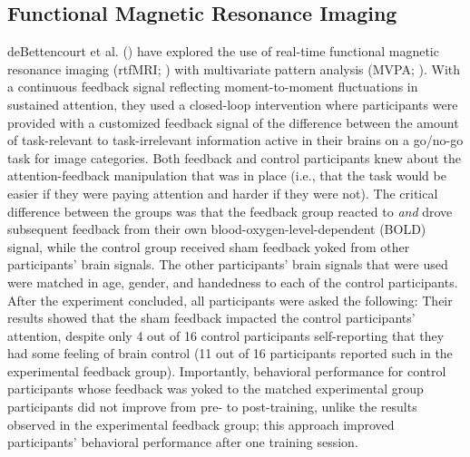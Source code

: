 \subsection{Functional Magnetic Resonance Imaging}
deBettencourt et al. (\cite*{megan2015closed}) have explored the use of real-time functional magnetic resonance imaging (rtfMRI; \cite{weiskopf2004principles, laconte2011decoding, sulzer2013real}) with multivariate pattern analysis (MVPA; \cite{norman2006beyond}). With a continuous feedback signal reflecting moment-to-moment fluctuations in sustained attention, they used a closed-loop intervention where participants were provided with a customized feedback signal of the difference between the amount of task-relevant to task-irrelevant information active in their brains on a go/no-go task for image categories. Both feedback and control participants knew about the attention-feedback manipulation that was in place (i.e., that the task would be easier if they were paying attention and harder if they were not). The critical difference between the groups was that the feedback group reacted to \emph{and} drove subsequent feedback from their own blood-oxygen-level-dependent (BOLD) signal, while the control group received sham feedback yoked from other participants’ brain signals. The other participants’ brain signals that were used were matched in age, gender, and handedness to each of the control participants. After the experiment concluded, all participants were asked the following:  Their results showed that the sham feedback impacted the control participants’ attention, despite only 4 out of 16 control participants self-reporting that they had some feeling of brain control (11 out of 16 participants reported such in the experimental feedback group). Importantly, behavioral performance for control participants whose feedback was yoked to the matched experimental group participants did not improve from pre- to post-training, unlike the results observed in the experimental feedback group; this approach improved participants' behavioral performance after one training session. 

